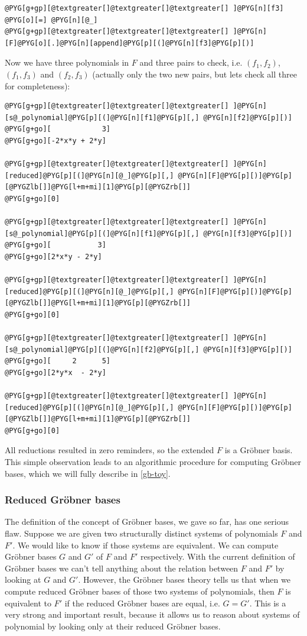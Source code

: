 \begin{Verbatim}[commandchars=@\[\]]
@PYG[g+gp][@textgreater[]@textgreater[]@textgreater[] ]@PYG[n][f3] @PYG[o][=] @PYG[n][@_]
@PYG[g+gp][@textgreater[]@textgreater[]@textgreater[] ]@PYG[n][F]@PYG[o][.]@PYG[n][append]@PYG[p][(]@PYG[n][f3]@PYG[p][)]
\end{Verbatim}
\noindent
Now we have three polynomials in $F$ and three pairs to check, i.e. $(f_1, f_2)$, $(f_1, f_3)$
and $(f_2, f_3)$ (actually only the two new pairs, but lets check all three for completeness):

\begin{Verbatim}[commandchars=@\[\]]
@PYG[g+gp][@textgreater[]@textgreater[]@textgreater[] ]@PYG[n][s@_polynomial]@PYG[p][(]@PYG[n][f1]@PYG[p][,] @PYG[n][f2]@PYG[p][)]
@PYG[g+go][            3]
@PYG[g+go][-2*x*y + 2*y]

@PYG[g+gp][@textgreater[]@textgreater[]@textgreater[] ]@PYG[n][reduced]@PYG[p][(]@PYG[n][@_]@PYG[p][,] @PYG[n][F]@PYG[p][)]@PYG[p][@PYGZlb[]]@PYG[l+m+mi][1]@PYG[p][@PYGZrb[]]
@PYG[g+go][0]

@PYG[g+gp][@textgreater[]@textgreater[]@textgreater[] ]@PYG[n][s@_polynomial]@PYG[p][(]@PYG[n][f1]@PYG[p][,] @PYG[n][f3]@PYG[p][)]
@PYG[g+go][           3]
@PYG[g+go][2*x*y - 2*y]

@PYG[g+gp][@textgreater[]@textgreater[]@textgreater[] ]@PYG[n][reduced]@PYG[p][(]@PYG[n][@_]@PYG[p][,] @PYG[n][F]@PYG[p][)]@PYG[p][@PYGZlb[]]@PYG[l+m+mi][1]@PYG[p][@PYGZrb[]]
@PYG[g+go][0]

@PYG[g+gp][@textgreater[]@textgreater[]@textgreater[] ]@PYG[n][s@_polynomial]@PYG[p][(]@PYG[n][f2]@PYG[p][,] @PYG[n][f3]@PYG[p][)]
@PYG[g+go][     2      5]
@PYG[g+go][2*y*x  - 2*y]

@PYG[g+gp][@textgreater[]@textgreater[]@textgreater[] ]@PYG[n][reduced]@PYG[p][(]@PYG[n][@_]@PYG[p][,] @PYG[n][F]@PYG[p][)]@PYG[p][@PYGZlb[]]@PYG[l+m+mi][1]@PYG[p][@PYGZrb[]]
@PYG[g+go][0]
\end{Verbatim}
\noindent
All reductions resulted in zero reminders, so the extended $F$ is a Gröbner basis. This simple
observation leads to an algorithmic procedure for computing Gröbner bases, which we will fully
describe in \ref{gb-toy}.


\subsubsection{Reduced Gröbner bases}

The definition of the concept of Gröbner bases, we gave so far, has one serious flaw. Suppose we
are given two structurally distinct systems of polynomials $F$ and $F'$. We would like to know if
those systems are equivalent. We can compute Gröbner bases $G$ and $G'$ of $F$ and $F'$ respectively.
With the current definition of Gröbner bases we can't tell anything about the relation between $F$
and $F'$ by looking at $G$ and $G'$. However, the Gröbner bases theory tells us that when we compute
reduced Gröbner bases of those two systems of polynomials, then $F$ is equivalent to $F'$ if the reduced
Gröbner bases are equal, i.e. $G = G'$. This is a very strong and important result, because it allows
us to reason about systems of polynomial by looking only at their reduced Gröbner bases.

